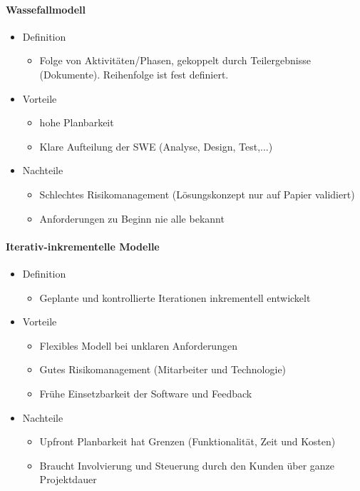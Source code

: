 \documentclass{article}
\begin{document}
\paragraph{Wassefallmodell}
\begin{itemize}
    \item Definition
    \begin{itemize}
        \item Folge von Aktivitäten/Phasen, gekoppelt durch Teilergebnisse (Dokumente). Reihenfolge ist fest definiert.
    \end{itemize}
    \item Vorteile
    \begin{itemize}
        \item hohe Planbarkeit
        \item Klare Aufteilung der SWE (Analyse, Design, Test,...)

      \end{itemize}
    \item Nachteile
    \begin{itemize}
        \item Schlechtes Risikomanagement (Lösungskonzept nur auf Papier validiert)
        \item Anforderungen zu Beginn nie alle bekannt
    \end{itemize}
\end{itemize}

\paragraph{Iterativ-inkrementelle Modelle}
\begin{itemize}
    \item Definition
    \begin{itemize}
        \item Geplante und kontrollierte Iterationen inkrementell entwickelt
    \end{itemize}
    \item Vorteile
    \begin{itemize}
        \item Flexibles Modell bei unklaren Anforderungen
        \item Gutes Risikomanagement (Mitarbeiter und Technologie)
        \item Frühe Einsetzbarkeit der Software und Feedback
    \end{itemize}
    \item Nachteile
    \begin{itemize}
        \item Upfront Planbarkeit hat Grenzen (Funktionalität, Zeit und Kosten)
        \item Braucht Involvierung und Steuerung durch den Kunden über ganze Projektdauer
    \end{itemize}
\end{itemize}
\end{document}
